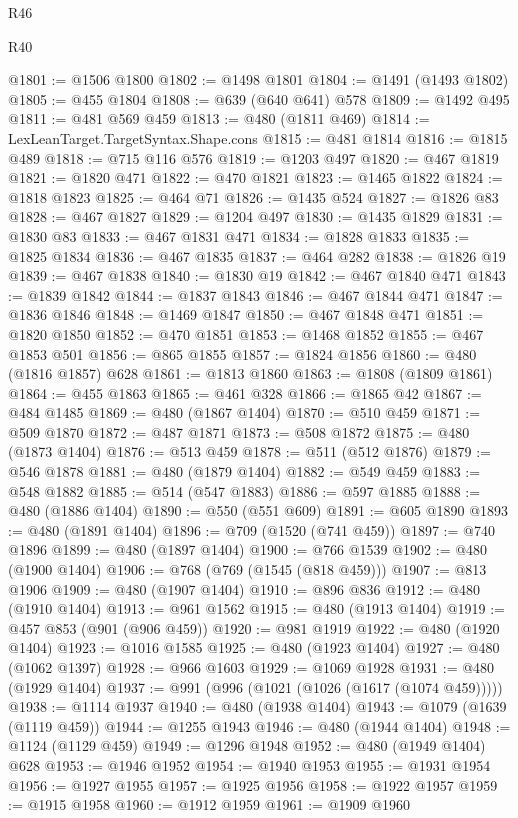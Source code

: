 \begin{lexlean}{R46}
\begin{lexlean}{R40}
\begin{coremodule}
{{{{{{{{{{{{{{{{{{{{{{{{{{{{{{{{{{{{{{{{{{{{{{{{{{{{{{{{{{{{{{{{{{{{{{{{{{{{{{{{{{{{{{{{{{{{{{{{{{{{{{{{{{{{{@1801 := @1506 @1800
@1802 := @1498 @1801
@1804 := @1491 (@1493 @1802)
@1805 := @455 @1804
@1808 := @639 (@640 @641) @578
@1809 := @1492 @495
@1811 := @481 @569 @459
@1813 := @480 (@1811 @469)
@1814 := LexLeanTarget.TargetSyntax.Shape.cons
@1815 := @481 @1814
@1816 := @1815 @489
@1818 := @715 @116 @576
@1819 := @1203 @497
@1820 := @467 @1819
@1821 := @1820 @471
@1822 := @470 @1821
@1823 := @1465 @1822
@1824 := @1818 @1823
@1825 := @464 @71
@1826 := @1435 @524
@1827 := @1826 @83
@1828 := @467 @1827
@1829 := @1204 @497
@1830 := @1435 @1829
@1831 := @1830 @83
@1833 := @467 @1831 @471
@1834 := @1828 @1833
@1835 := @1825 @1834
@1836 := @467 @1835
@1837 := @464 @282
@1838 := @1826 @19
@1839 := @467 @1838
@1840 := @1830 @19
@1842 := @467 @1840 @471
@1843 := @1839 @1842
@1844 := @1837 @1843
@1846 := @467 @1844 @471
@1847 := @1836 @1846
@1848 := @1469 @1847
@1850 := @467 @1848 @471
@1851 := @1820 @1850
@1852 := @470 @1851
@1853 := @1468 @1852
@1855 := @467 @1853 @501
@1856 := @865 @1855
@1857 := @1824 @1856
@1860 := @480 (@1816 @1857) @628
@1861 := @1813 @1860
@1863 := @1808 (@1809 @1861)
@1864 := @455 @1863
@1865 := @461 @328
@1866 := @1865 @42
@1867 := @484 @1485
@1869 := @480 (@1867 @1404)
@1870 := @510 @459
@1871 := @509 @1870
@1872 := @487 @1871
@1873 := @508 @1872
@1875 := @480 (@1873 @1404)
@1876 := @513 @459
@1878 := @511 (@512 @1876)
@1879 := @546 @1878
@1881 := @480 (@1879 @1404)
@1882 := @549 @459
@1883 := @548 @1882
@1885 := @514 (@547 @1883)
@1886 := @597 @1885
@1888 := @480 (@1886 @1404)
@1890 := @550 (@551 @609)
@1891 := @605 @1890
@1893 := @480 (@1891 @1404)
@1896 := @709 (@1520 (@741 @459))
@1897 := @740 @1896
@1899 := @480 (@1897 @1404)
@1900 := @766 @1539
@1902 := @480 (@1900 @1404)
@1906 := @768 (@769 (@1545 (@818 @459)))
@1907 := @813 @1906
@1909 := @480 (@1907 @1404)
@1910 := @896 @836
@1912 := @480 (@1910 @1404)
@1913 := @961 @1562
@1915 := @480 (@1913 @1404)
@1919 := @457 @853 (@901 (@906 @459))
@1920 := @981 @1919
@1922 := @480 (@1920 @1404)
@1923 := @1016 @1585
@1925 := @480 (@1923 @1404)
@1927 := @480 (@1062 @1397)
@1928 := @966 @1603
@1929 := @1069 @1928
@1931 := @480 (@1929 @1404)
@1937 := @991 (@996 (@1021 (@1026 (@1617 (@1074 @459)))))
@1938 := @1114 @1937
@1940 := @480 (@1938 @1404)
@1943 := @1079 (@1639 (@1119 @459))
@1944 := @1255 @1943
@1946 := @480 (@1944 @1404)
@1948 := @1124 (@1129 @459)
@1949 := @1296 @1948
@1952 := @480 (@1949 @1404) @628
@1953 := @1946 @1952
@1954 := @1940 @1953
@1955 := @1931 @1954
@1956 := @1927 @1955
@1957 := @1925 @1956
@1958 := @1922 @1957
@1959 := @1915 @1958
@1960 := @1912 @1959
@1961 := @1909 @1960
}}}}}}}}}}}}}}}}}}}}}}}}}}}}}}}}}}}}}}}}}}}}}}}}}}}}}}}}}}}}}}}}}}}}}}}}}}}}}}}}}}}}}}}}}}}}}}}}}}}}}}}}}}}}}
\end{coremodule}
\end{lexlean}
\end{lexlean}
